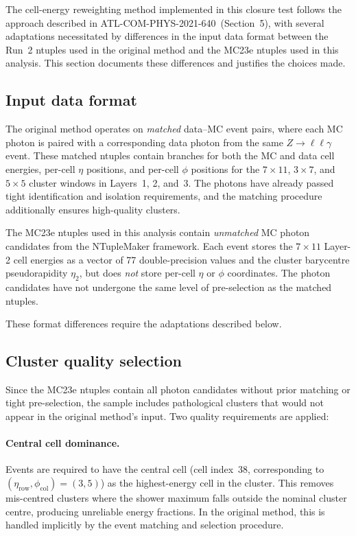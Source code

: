 \documentclass[12pt,a4paper]{article}
\begin{document}
The cell-energy reweighting method implemented in this closure test follows
the approach described in ATL-COM-PHYS-2021-640~(Section~5), with several
adaptations necessitated by differences in the input data format between the
Run~2 ntuples used in the original method and the MC23e ntuples used in this
analysis. This section documents these differences and justifies the choices
made.

\subsection{Input data format}
\label{sec:adaptations:input}

The original method operates on \emph{matched} data--MC event pairs, where
each MC photon is paired with a corresponding data photon from the same
$Z\to\ell\ell\gamma$ event. These matched ntuples contain branches for both
the MC and data cell energies, per-cell $\eta$ positions, and per-cell $\phi$
positions for the $7\times11$, $3\times7$, and $5\times5$ cluster windows in
Layers~1, 2, and~3. The photons have already passed tight identification and
isolation requirements, and the matching procedure additionally ensures
high-quality clusters.

The MC23e ntuples used in this analysis contain \emph{unmatched} MC photon
candidates from the NTupleMaker framework. Each event stores the $7\times11$
Layer-2 cell energies as a vector of 77 double-precision values and the
cluster barycentre pseudorapidity $\eta_2$, but does \emph{not} store
per-cell $\eta$ or $\phi$ coordinates. The photon candidates have not
undergone the same level of pre-selection as the matched ntuples.

These format differences require the adaptations described below.

\subsection{Cluster quality selection}
\label{sec:adaptations:quality}

Since the MC23e ntuples contain all photon candidates without prior matching
or tight pre-selection, the sample includes pathological clusters that
would not appear in the original method's input. Two quality requirements
are applied:

\paragraph{Central cell dominance.}
Events are required to have the central cell (cell index~38, corresponding to
$(\eta_\text{row},\phi_\text{col})=(3,5)$) as the highest-energy cell in the
cluster. This removes mis-centred clusters where the shower maximum falls
outside the nominal cluster centre, producing unreliable energy fractions. In
the original method, this is handled implicitly by the event matching and
selection procedure.
\end{document}
